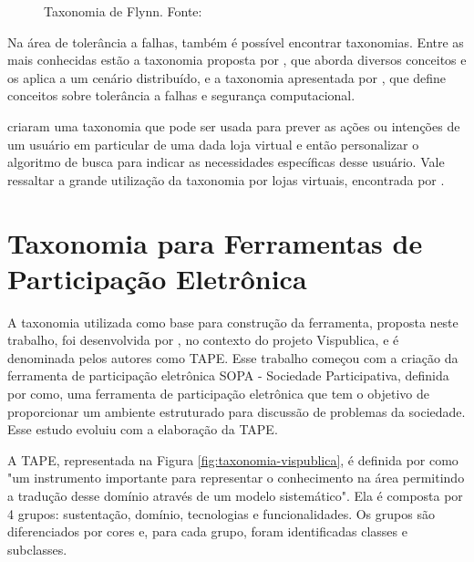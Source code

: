 \begin{figure}[!ht]
    \caption{Taxonomia de Flynn. Fonte: }
    \label{fig:taxonomiaFlynn}  
\end{figure}

\vspace{0.5cm}
\par
Na área de tolerância a falhas, também é possível encontrar taxonomias. Entre as mais conhecidas estão a taxonomia proposta por
, que aborda diversos conceitos e os aplica a um cenário distribuído,
e a taxonomia apresentada por , que define conceitos sobre tolerância a falhas e segurança computacional.

\par
{} criaram uma taxonomia que pode ser usada para prever as ações ou intenções de um usuário em particular de uma dada loja virtual
e então personalizar o algoritmo de busca para indicar as necessidades específicas desse usuário. Vale ressaltar a grande utilização da taxonomia por lojas virtuais,
encontrada por \cite{sondhi2018taxonomy}.

\section{Taxonomia para Ferramentas de Participação Eletrônica}
\label{sec:taxonomia e-part tools}

\par
A taxonomia utilizada como base para construção da ferramenta, proposta neste trabalho, foi desenvolvida por , no contexto do projeto Vispublica, e é denominada pelos autores como TAPE. 
Esse trabalho começou com a criação da ferramenta de participação eletrônica SOPA - Sociedade Participativa, definida por  como, uma ferramenta
de participação eletrônica que tem o objetivo de proporcionar um ambiente estruturado para discussão de problemas da sociedade.
Esse estudo evoluiu com a elaboração da TAPE. 

\par
A TAPE, representada na Figura \ref{fig:taxonomia-vispublica}, é definida por  como "um instrumento importante para representar o conhecimento na área 
permitindo a tradução desse domínio através de um modelo sistemático". Ela é composta por 4 grupos: sustentação, domínio, tecnologias e funcionalidades.
Os grupos são diferenciados por cores e, para cada grupo, foram identificadas classes e subclasses.


